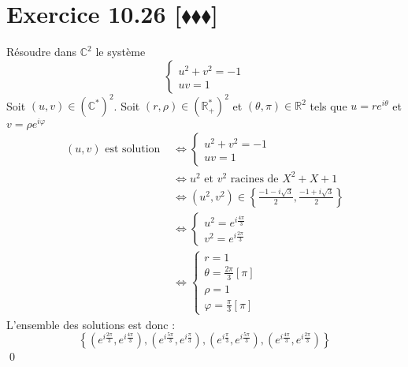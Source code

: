 \documentclass[10pt]{article}
\begin{document}
\section*{Exercice 10.26 [$\blacklozenge\blacklozenge\blacklozenge$]}
\begin{tcolorbox}[enhanced, width=7in, center, size=fbox, fontupper=\large, drop shadow southwest]
    Résoudre dans $\mathbb{C}^2$ le système
    \begin{equation*}
        \begin{cases}
            u^2 + v^2 = -1\\
            uv = 1
        \end{cases}
    \end{equation*}
    Soit $(u,v)\in(\mathbb{C}^*)^2$. Soit $(r,\rho)\in(\mathbb{R}_+^*)^2$ et $(\theta, \pi)\in\mathbb{R}^2$ tels que $u=re^{i\theta}$ et $v=\rho e^{i\varphi}$
    \begin{align*}
        (u,v) \text{ est solution } &\iff \begin{cases}
            u^2 + v^2 = -1\\
            uv = 1
        \end{cases}\\
        &\iff u^2 \text{ et } v^2 \text{ racines de } X^2 + X + 1\\
        &\iff(u^2, v^2)\in\left\{\frac{-1-i\sqrt{3}}{2}, \frac{-1+i\sqrt{3}}{2}\right\}\\
        &\iff\begin{cases}
            u^2 = e^{i\frac{4\pi}{3}}\\
            v^2 = e^{i\frac{2\pi}{3}}
        \end{cases}\\
        &\iff\begin{cases}
            r = 1\\
            \theta = \frac{2\pi}{3}[\pi]\\
            \rho = 1\\
            \varphi = \frac{\pi}{3}[\pi]
        \end{cases}
    \end{align*}
    L'ensemble des solutions est donc :
    \begin{equation*}
        \left\{(e^{i\frac{2\pi}{3}}, e^{i\frac{4\pi}{3}}), (e^{i\frac{5\pi}{3}}, e^{i\frac{\pi}{3}}), (e^{i\frac{\pi}{3}}, e^{i\frac{5\pi}{3}}), (e^{i\frac{4\pi}{3}}, e^{i\frac{2\pi}{3}})\right\}
    \end{equation*}
    \qed
\end{tcolorbox}
\end{document}
